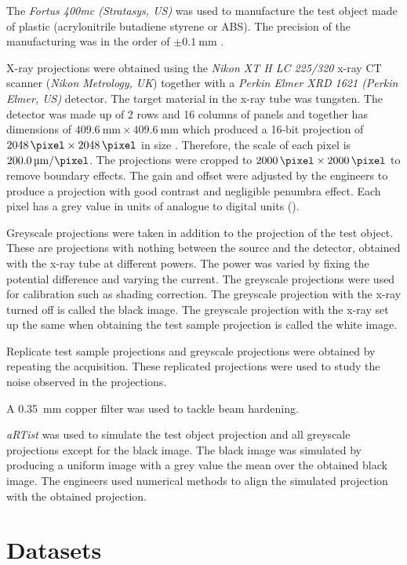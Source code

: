 The \emph{Fortus 400mc (Stratasys, US)} was used to manufacture the test object made of plastic (acrylonitrile butadiene styrene or ABS). The precision of the manufacturing was in the order of $\pm\SI{0.1}{\milli\metre}$ \citep{hanseen2013fortus}.

X-ray projections were obtained using the \emph{Nikon XT H LC 225/320} x-ray CT scanner (\emph{Nikon Metrology, UK}) together with a \emph{Perkin Elmer XRD 1621 (Perkin Elmer, US)} detector. The target material in the x-ray tube was tungsten. The detector was made up of 2 rows and 16 columns of panels and together has dimensions of $\SI{409.6}{\milli\metre}\times\SI{409.6}{\milli\metre}$ which produced a 16-bit projection of $\SI{2048}{\pixel}\times\SI{2048}{\pixel}$ in size \citep{perkinelmer2006xrd}. Therefore, the scale of each pixel is $\SI{200.0}{\micro\metre\per\pixel}$. The projections were cropped to $\SI{2000}{\pixel}\times\SI{2000}{\pixel}$ to remove boundary effects. The gain and offset were adjusted by the engineers to produce a projection with good contrast and negligible penumbra effect. Each pixel has a grey value in units of analogue to digital units (\SI{}{\adu}).

Greyscale projections were taken in addition to the projection of the test object. These are projections with nothing between the source and the detector, obtained with the x-ray tube at different powers. The power was varied by fixing the potential difference and varying the current. The greyscale projections were used for calibration such as shading correction. The greyscale projection with the x-ray turned off is called the black image. The greyscale projection with the x-ray set up the same when obtaining the test sample projection is called the white image.

Replicate test sample projections and greyscale projections were obtained by repeating the acquisition. These replicated projections were used to study the noise observed in the projections.

A \SI{0.35}{\milli\metre} copper filter was used to tackle beam hardening.

\emph{aRTist} was used to simulate the test object projection and all greyscale projections except for the black image. The black image was simulated by producing a uniform image with a grey value the mean over the obtained black image. The engineers used numerical methods to align the simulated projection with the obtained projection.

\section{Datasets}

